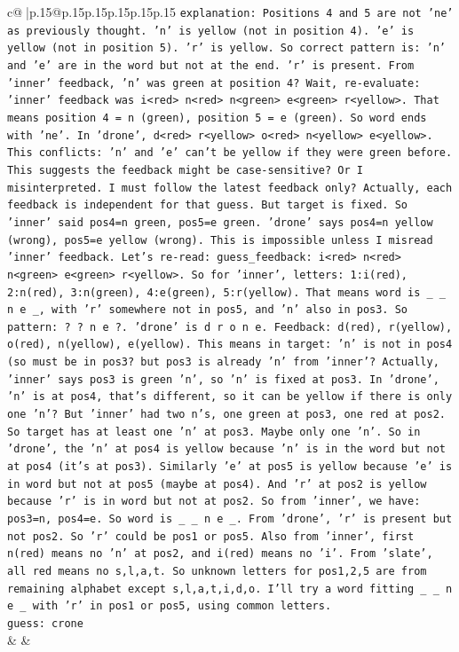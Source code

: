 \documentclass{article}
\begin{document}
{\begin{supertabular}{c@{$\;$}|p{.15\linewidth}@{}p{.15\linewidth}p{.15\linewidth}p{.15\linewidth}p{.15\linewidth}p{.15\linewidth}}
{{{                \texttt{explanation: Positions 4 and 5 are not 'ne' as previously thought. 'n' is yellow (not in position 4). 'e' is yellow (not in position 5). 'r' is yellow. So correct pattern is: 'n' and 'e' are in the word but not at the end. 'r' is present. From 'inner' feedback, 'n' was green at position 4? Wait, re{-}evaluate: 'inner' feedback was i<red> n<red> n<green> e<green> r<yellow>. That means position 4 = n (green), position 5 = e (green). So word ends with 'ne'. In 'drone', d<red> r<yellow> o<red> n<yellow> e<yellow>. This conflicts: 'n' and 'e' can't be yellow if they were green before. This suggests the feedback might be case{-}sensitive? Or I misinterpreted. I must follow the latest feedback only? Actually, each feedback is independent for that guess. But target is fixed. So 'inner' said pos4=n green, pos5=e green. 'drone' says pos4=n yellow (wrong), pos5=e yellow (wrong). This is impossible unless I misread 'inner' feedback. Let's re{-}read: guess\_feedback: i<red> n<red> n<green> e<green> r<yellow>. So for 'inner', letters: 1:i(red), 2:n(red), 3:n(green), 4:e(green), 5:r(yellow). That means word is \_ \_ n e \_, with 'r' somewhere not in pos5, and 'n' also in pos3. So pattern: ? ? n e ?. 'drone' is d r o n e. Feedback: d(red), r(yellow), o(red), n(yellow), e(yellow). This means in target: 'n' is not in pos4 (so must be in pos3? but pos3 is already 'n' from 'inner'? Actually, 'inner' says pos3 is green 'n', so 'n' is fixed at pos3. In 'drone', 'n' is at pos4, that's different, so it can be yellow if there is only one 'n'? But 'inner' had two n's, one green at pos3, one red at pos2. So target has at least one 'n' at pos3. Maybe only one 'n'. So in 'drone', the 'n' at pos4 is yellow because 'n' is in the word but not at pos4 (it's at pos3). Similarly 'e' at pos5 is yellow because 'e' is in word but not at pos5 (maybe at pos4). And 'r' at pos2 is yellow because 'r' is in word but not at pos2. So from 'inner', we have: pos3=n, pos4=e. So word is \_ \_ n e \_. From 'drone', 'r' is present but not pos2. So 'r' could be pos1 or pos5. Also from 'inner', first n(red) means no 'n' at pos2, and i(red) means no 'i'. From 'slate', all red means no s,l,a,t. So unknown letters for pos1,2,5 are from remaining alphabet except s,l,a,t,i,d,o. I'll try a word fitting \_ \_ n e \_ with 'r' in pos1 or pos5, using common letters.} \\
\texttt{guess: crone} \\
            }
        }
    }
    & & \\ \\


\end{supertabular}}
\end{document}
